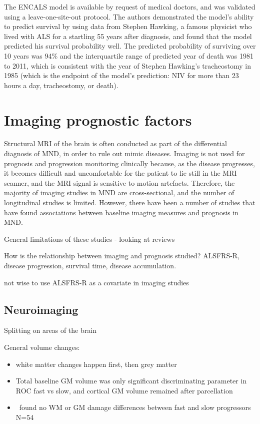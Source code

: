 The ENCALS model is available by request of medical doctors, and was validated using a leave-one-site-out protocol.
The authors demonstrated the model's ability to predict survival by using data from Stephen Hawking, a famous physicist who lived with ALS for a startling 55 years after diagnosis, and found that the model predicted his survival probability well.
The predicted probability of surviving over 10 years was 94\% and the interquartile range of predicted year of death was 1981 to 2011, which is consistent with the year of Stephen Hawking's tracheostomy in 1985 (which is the endpoint of the model's prediction: NIV for more than 23 hours a day, tracheostomy, or death).




\section{Imaging prognostic factors}

Structural MRI of the brain is often conducted as part of the differential diagnosis of MND, in order to rule out mimic diseases.
Imaging is not used for prognosis and progression monitoring clinically because, as the disease progresses, it becomes difficult and uncomfortable for the patient to lie still in the MRI scanner, and the MRI signal is sensitive to motion artefacts.
Therefore, the majority of imaging studies in MND are cross-sectional, and the number of longitudinal studies is limited.
However, there have been a number of studies that have found associations between baseline imaging measures and prognosis in MND.

General limitations of these studies - looking at reviews

How is the relationship between imaging and prognosis studied? ALSFRS-R, disease progression, survival time, disease accumulation.

\cite{bedeLessonsALSImaging2014} not wise to use ALSFRS-R as a covariate in imaging studies


\subsection{Neuroimaging}

Splitting on areas of the brain

General volume changes:
\begin{itemize}
    \item white matter changes happen first, then grey matter~\cite{bedeLongitudinalStructuralChanges2018, menkeWidespreadGreyMatter2014}
    \item Total baseline GM volume was only significant discriminating parameter in ROC fast vs slow, and cortical GM volume remained after parcellation~\cite{elmendiliAssociationBrainUpper2023}
    \item \cite{trojsiRestingStateFunctional2021}~found no WM or GM damage differences between fast and slow progressors N=54
\end{itemize}

